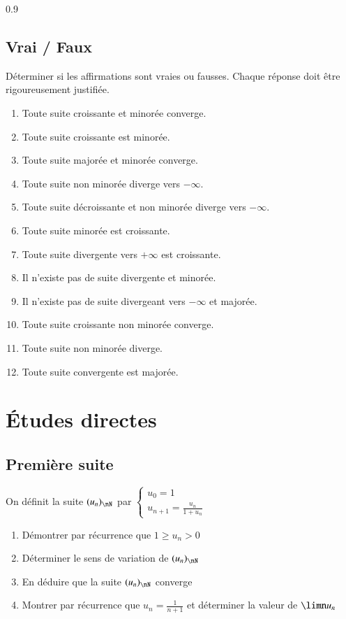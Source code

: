 \documentclass[oneside,12pt]{article}          %
\begin{document}
\begin{spacing}{0.9}
\subsection{Vrai / Faux}

Déterminer si les affirmations sont vraies ou fausses. Chaque réponse doit être rigoureusement justifiée.
\begin{enumerate}
	\item Toute suite croissante et minorée converge.
    \item Toute suite croissante est minorée.
    \item Toute suite majorée et minorée converge.
    \item Toute suite non minorée diverge vers $-\infty$.
    \item Toute suite décroissante et non minorée diverge vers $-\infty$.
    \item Toute suite minorée est croissante.
    \item Toute suite divergente vers $+\infty$ est croissante.
    \item Il n'existe pas de suite divergente et minorée.
    \item Il n'existe pas de suite divergeant vers $-\infty$ et majorée.
    \item Toute suite croissante non minorée converge.
	\item Toute suite non minorée diverge.
    \item Toute suite convergente est majorée.
\end{enumerate}



\section{Études directes}

\subsection{Première suite}
On définit la suite $(u_n)_{\nN}$ par $\begin{cases}u_0=1\\u_{n+1}=\frac{u_n}{1+u_n}\end{cases}$
\begin{enumerate}
    \item Démontrer par récurrence que $1\geq u_n>0$
    \item Déterminer le sens de variation de $(u_n)_{\nN}$
    \item En déduire que la suite $(u_n)_{\nN}$ converge
    \item Montrer par récurrence que $u_n=\frac{1}{n+1}$  et déterminer la valeur de $\limn u_n$
\end{enumerate}




\end{spacing}
\end{document}
